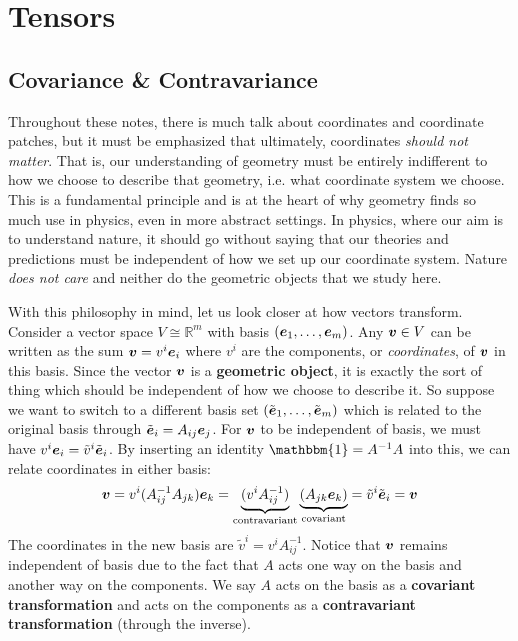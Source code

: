 \documentclass[onecolumn]{gwclass}
\begin{document}
	
	
	\newpage
	\section{Tensors}
	
	\subsection{Covariance \& Contravariance}
	
	Throughout these notes, there is much talk about coordinates and coordinate patches, but it must be emphasized that ultimately, coordinates \emph{should not matter}. That is, our understanding of geometry must be entirely indifferent to how we choose to describe that geometry, i.e. what coordinate system we choose. This is a fundamental principle and is at the heart of why geometry finds so much use in physics, even in more abstract settings. In physics, where our aim is to understand nature, it should go without saying that our theories and predictions must be independent of how we set up our coordinate system. Nature \emph{does not care} and neither do the geometric objects that we study here. 
	
	With this philosophy in mind, let us look closer at how vectors transform. Consider a vector space $V\cong\mathbb{R}^m$ with basis $(\boldsymbol{e}_1,\dots,\boldsymbol{e}_m)$. Any $\boldsymbol{v}\in V$ can be written as the sum $\boldsymbol{v}=v^i\boldsymbol{e}_i$ where $v^i$ are the components, or \emph{coordinates}, of $\boldsymbol{v}$ in this basis. Since the vector $\boldsymbol{v}$ is a \textbf{geometric object}, it is exactly the sort of thing which should be independent of how we choose to describe it. So suppose we want to switch to a different basis set $(\tilde{\boldsymbol{e}}_1,\dots,\tilde{\boldsymbol{e}}_m)$ which is related to the original basis through $\tilde{\boldsymbol{e}}_i = A_{ij}\boldsymbol{e}_j$. For $\boldsymbol{v}$ to be independent of basis, we must have $v^i\boldsymbol{e}_i = \tilde{v}^i\tilde{\boldsymbol{e}}_i$. By inserting an identity $\mathbbm{1}=A^{-1}A$ into this, we can relate coordinates in either basis:
	$$ \boldsymbol{v}=v^i(A_{ij}^{-1}A_{jk})\boldsymbol{e}_k = \underbrace{(v^i A_{ij}^{-1})}_{\text{\normalfont{contravariant}}}\underbrace{(A_{jk}\boldsymbol{e}_k)}_{\text{\normalfont{covariant}}} = \tilde{v}^i \tilde{\boldsymbol{e}}_i = \boldsymbol{v}$$
	The coordinates in the new basis are $\tilde{v}^i = v^iA^{-1}_{ij}$. Notice that $\boldsymbol{v}$ remains independent of basis due to the fact that $A$ acts one way on the basis and another way on the components. We say $A$ acts on the basis as a \textbf{covariant transformation} and acts on the components as a \textbf{contravariant transformation} (through the inverse).
	
\end{document}
